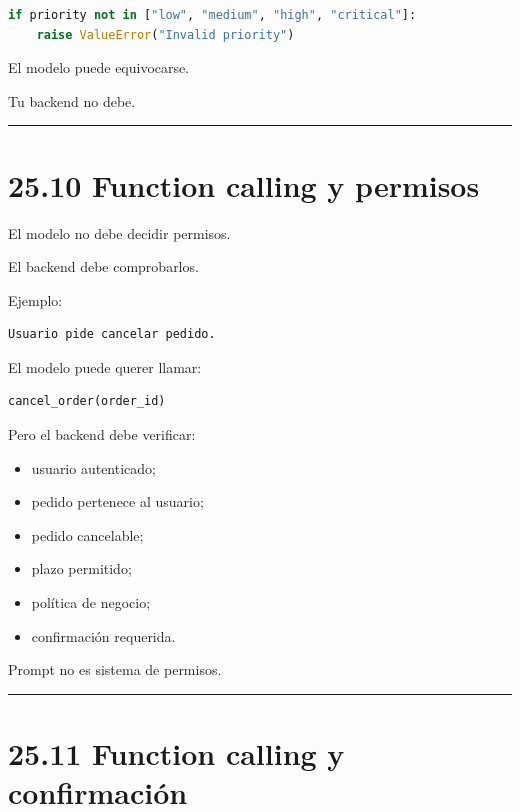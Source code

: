 \begin{lstlisting}[language=Python]
if priority not in ["low", "medium", "high", "critical"]:
    raise ValueError("Invalid priority")
\end{lstlisting}

El modelo puede equivocarse.

Tu backend no debe.

\begin{center}\rule{0.5\linewidth}{0.5pt}\end{center}

\section{25.10 Function calling y
permisos}\label{function-calling-y-permisos}

El modelo no debe decidir permisos.

El backend debe comprobarlos.

Ejemplo:

\begin{lstlisting}
Usuario pide cancelar pedido.
\end{lstlisting}

El modelo puede querer llamar:

\begin{lstlisting}
cancel_order(order_id)
\end{lstlisting}

Pero el backend debe verificar:

\begin{itemize}
\tightlist
\item
  usuario autenticado;
\item
  pedido pertenece al usuario;
\item
  pedido cancelable;
\item
  plazo permitido;
\item
  política de negocio;
\item
  confirmación requerida.
\end{itemize}

Prompt no es sistema de permisos.

\begin{center}\rule{0.5\linewidth}{0.5pt}\end{center}

\section{25.11 Function calling y
confirmación}\label{function-calling-y-confirmaciuxf3n}

